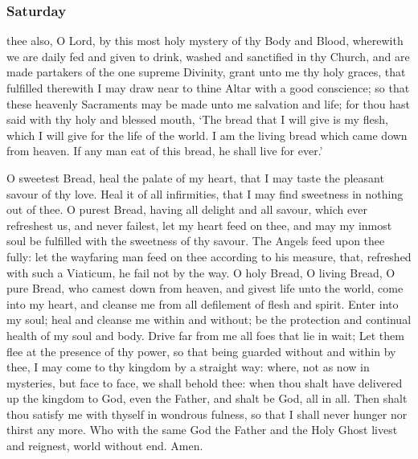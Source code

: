 \subsubsection{Saturday}
 thee also, O Lord, by this most holy mystery of thy Body and Blood, wherewith we are daily fed and given to drink, washed and sanctified in thy Church, and are made partakers of the one supreme Divinity, grant unto me thy holy graces, that fulfilled therewith I may draw near to thine Altar with a good conscience; so that these heavenly Sacraments may be made unto me salvation and life; for thou hast said with thy holy and blessed mouth, `The bread that I will give is my flesh, which I will give for the life of the world. I am the living bread which came down from heaven. If any man eat of this bread, he shall live for ever.'
\par
O sweetest Bread, heal the palate of my heart, that I may taste the pleasant savour of thy love. Heal it of all infirmities, that I may find sweetness in nothing out of thee. O purest Bread, having all delight and all savour, which ever refreshest us, and never failest, let my heart feed on thee, and may my inmost soul be fulfilled with the sweetness of thy savour. The Angels feed upon thee fully: let the wayfaring man feed on thee according to his measure, that, refreshed with such a Viaticum, he fail not by the way. O holy Bread, O living Bread, O pure Bread, who camest down from heaven, and givest life unto the world, come into my heart, and cleanse me from all defilement of flesh and spirit. Enter into my soul; heal and cleanse me within and without; be the protection and continual health of my soul and body. Drive far from me all foes that lie in wait; Let them flee at the presence of thy power, so that being guarded without and within by thee, I may come to thy kingdom by a straight way: where, not as now in mysteries, but face to face, we shall behold thee: when thou shalt have delivered up the kingdom to God, even the Father, and shalt be God, all in all. Then shalt thou satisfy me with thyself in wondrous fulness, so that I shall never hunger nor thirst any more. Who with the same God the Father and the Holy Ghost livest and reignest, world without end. Amen. 

